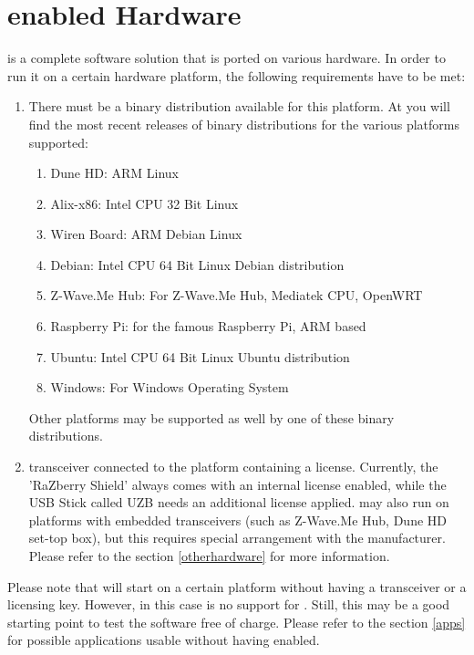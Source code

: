 \chapter{\zway enabled Hardware}

\zway is  a complete software solution that is ported on various hardware. In order to run 
it on a certain hardware platform, the following requirements have to be met:

\begin{enumerate}

\item There must be a binary \zway distribution available for this platform. At 
 you will find the most recent releases 
of \zway binary distributions for the various platforms supported:
	\begin{enumerate}
	\item Dune HD:  ARM Linux
	\item Alix-x86:  Intel CPU 32 Bit Linux
	\item Wiren Board: ARM Debian Linux
	\item Debian:  Intel CPU 64 Bit Linux Debian distribution
	\item Z-Wave.Me Hub: For Z-Wave.Me Hub, Mediatek CPU, OpenWRT
	\item Raspberry Pi: for the famous Raspberry Pi, ARM based
	\item Ubuntu: Intel CPU 64 Bit Linux Ubuntu distribution
	\item Windows: For Windows Operating System
	\end{enumerate}
Other platforms may be supported as well by one of these binary distributions.
\item \zwave transceiver connected to the platform containing a \zway license. Currently, 
the 'RaZberry Shield' always comes with an internal license enabled, while the USB Stick called UZB
needs an additional license applied. \zway may also run on platforms with embedded \zwave 
transceivers (such as Z-Wave.Me Hub, Dune HD set-top box), but this requires special 
arrangement with the manufacturer. Please refer to the section \ref{otherhardware} for 
more information.
\end{enumerate}

Please note that \zway will start on a certain platform without having a \zwave transceiver 
or a licensing key. However, in this case is no support for \zwave. Still, this may be a good 
starting point to test the software free of charge. Please refer to the section \ref{apps} 
for possible applications usable without having \zwave enabled.

